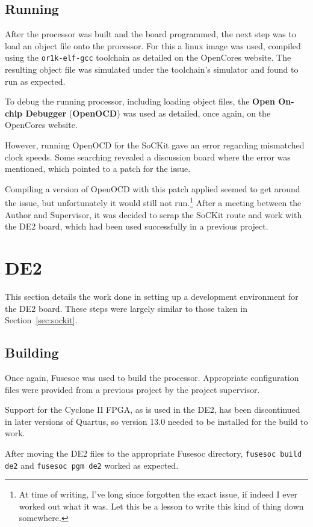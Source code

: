 \subsection{Running}
After the processor was built and the board programmed, the next step was to load an object file onto the processor. For this a linux image was used, compiled using the \texttt{or1k-elf-gcc} toolchain as detailed on the OpenCores website\cite{or1k-linux}. The resulting object file was simulated under the toolchain's simulator and found to run as expected.

To debug the running processor, including loading object files, the \textbf{Open On-chip Debugger} (\textbf{OpenOCD}) was used as detailed, once again, on the OpenCores website\cite{or1k-openocd}.

However, running OpenOCD for the SoCKit gave an error regarding mismatched clock speeds. Some searching revealed a discussion board\cite{openocd-sockit} where the error was mentioned, which pointed to a patch for the issue\cite{openocd-fix}.

Compiling a version of OpenOCD with this patch applied seemed to get around the issue, but unfortunately it would still not run.\footnote{At time of writing, I've long since forgotten the exact issue, if indeed I ever worked out what it was. Let this be a lesson to write this kind of thing down somewhere.} After a meeting between the Author and Supervisor, it was decided to scrap the SoCKit route and work with the DE2 board, which had been used successfully in a previous project.

\section{DE2}
This section details the work done in setting up a development environment for the DE2 board. These steps were largely similar to those taken in Section~\ref{sec:sockit}.

\subsection{Building}
Once again, Fusesoc was used to build the processor. Appropriate configuration files were provided from a previous project by the project supervisor.

Support for the Cyclone II FPGA, as is used in the DE2, has been discontinued in later versions of Quartus, so version 13.0 needed to be installed for the build to work.

After moving the DE2 files to the appropriate Fusesoc directory, \texttt{fusesoc build de2} and \texttt{fusesoc pgm de2} worked as expected.

